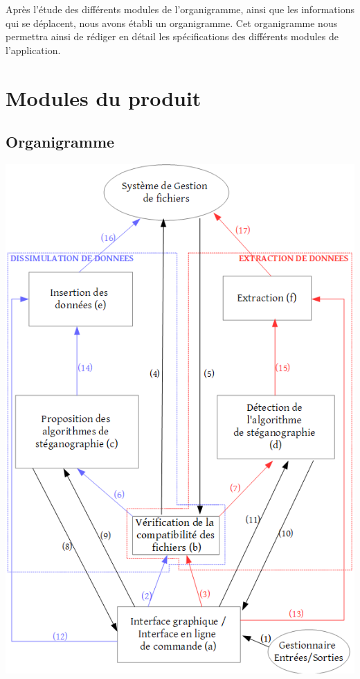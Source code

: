 \documentclass[11pt]{article}
\begin{document}
Après l'étude des différents modules de l'organigramme, ainsi que les informations 
qui se déplacent, nous avons établi un organigramme. 
Cet organigramme nous permettra ainsi de rédiger en détail les spécifications 
des différents modules de l'application. 

\section{Modules du produit}
\subsection{Organigramme}

\hspace{1cm}
\includegraphics[scale=0.71]{pictures/organigramme.png}
\end{document}
